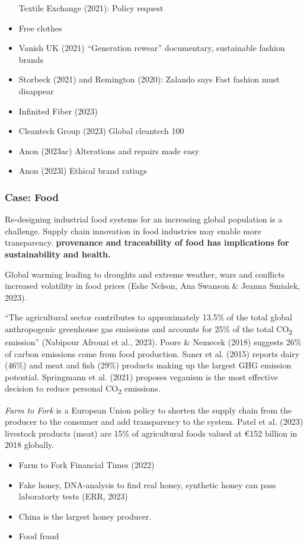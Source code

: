 \documentclass[
  letterpaper,
  DIV=11,
  numbers=noendperiod]{scrartcl}
\begin{document}
\begin{itemize}
  Textile Exchange (2021): Policy request
\item
  Free clothes
\item
  Vanish UK (2021) ``Generation rewear'' documentary, sustainable
  fashion brands
\item
  Storbeck (2021) and Remington (2020): Zalando says Fast fashion must
  disappear
\item
  Infinited Fiber (2023)
\item
  Cleantech Group (2023) Global cleantech 100
\item
  Anon (2023ac) Alterations and repairs made easy
\item
  Anon (2023l) Ethical brand ratings
\end{itemize}

\subsubsection{Case: Food}\label{case-food}

Re-designing industrial food systems for an increasing global population
is a challenge. Supply chain innovation in food industries may enable
more transparency. \textbf{provenance and traceability of food has
implications for sustainability and health.}

Global warming leading to droughts and extreme weather, wars and
conflicts increased volatility in food prices (Eshe Nelson, Ana Swanson
\& Jeanna Smialek, 2023).

``The agricultural sector contributes to approximately 13.5\% of the
total global anthropogenic greenhouse gas emissions and accounts for
25\% of the total CO\textsubscript{2} emission'' (Nabipour Afrouzi et
al., 2023). Poore \& Nemecek (2018) suggests 26\% of carbon emissions
come from food production. Saner et al. (2015) reports dairy (46\%) and
meat and fish (29\%) products making up the largest GHG emission
potential. Springmann et al. (2021) proposes veganism is the most
effective decision to reduce personal CO\textsubscript{2} emissions.

\emph{Farm to Fork} is a European Union policy to shorten the supply
chain from the producer to the consumer and add transparency to the
system. Patel et al. (2023) livestock products (meat) are 15\% of
agricultural foods valued at €152 billion in 2018 globally.

\begin{itemize}
\item
  Farm to Fork Financial Times (2022)
\item
  Fake honey, DNA-analysis to find real honey, synthetic honey can pass
  laboratorty tests (ERR, 2023)
\item
  China is the largest honey producer.
\item
  Food fraud
\end{itemize}
\end{document}
